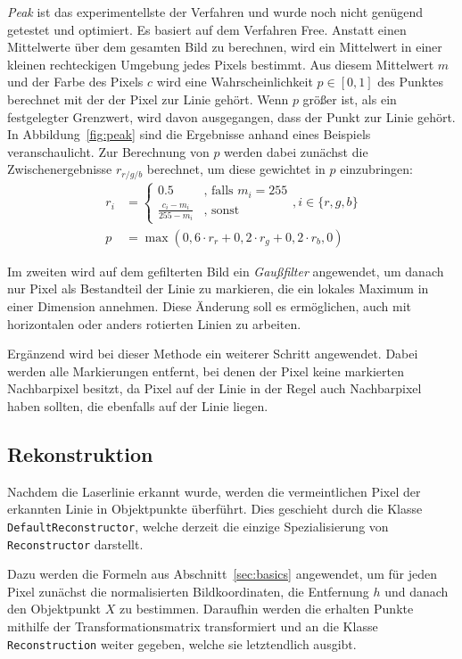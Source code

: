 \documentclass[ngerman,a4paper,parskip=half]{scrartcl}
\begin{document}
\emph{Peak} ist das experimentellste der Verfahren und wurde noch nicht genügend getestet und optimiert. Es basiert auf dem Verfahren Free.
Anstatt einen Mittelwerte über dem gesamten Bild zu berechnen, wird ein Mittelwert in einer kleinen rechteckigen Umgebung jedes Pixels bestimmt. Aus diesem Mittelwert $m$ und der Farbe des Pixels $c$ wird eine Wahrscheinlichkeit $p \in [0, 1]$ des Punktes berechnet mit der der Pixel zur Linie gehört. Wenn $p$ größer ist, als ein festgelegter Grenzwert, wird davon ausgegangen, dass der Punkt zur Linie gehört. In Abbildung~\ref{fig:peak} sind die Ergebnisse anhand eines Beispiels veranschaulicht.
Zur Berechnung von $p$ werden dabei zunächst die Zwischenergebnisse $r_{r/g/b}$ berechnet, um diese gewichtet in $p$ einzubringen:
\begin{align*}
	r_i &= \begin{cases}
	0.5                         &\text{, falls } m_i = 255\\
	\frac{c_i - m_i}{255 - m_i} &\text{, sonst}
	\end{cases}, i \in \{r,g,b\}\\
	p &= \max(0,6 \cdot r_r + 0,2 \cdot r_g + 0,2 \cdot r_b, 0)
\end{align*}

Im zweiten wird auf dem gefilterten Bild ein \emph{Gaußfilter} angewendet, um danach nur Pixel als Bestandteil der Linie zu markieren, die ein lokales Maximum in einer Dimension annehmen. Diese Änderung soll es ermöglichen, auch mit horizontalen oder anders rotierten Linien zu arbeiten.

Ergänzend wird bei dieser Methode ein weiterer Schritt angewendet. Dabei werden alle Markierungen entfernt, bei denen der Pixel keine markierten Nachbarpixel besitzt, da Pixel auf der Linie in der Regel auch Nachbarpixel haben sollten, die ebenfalls auf der Linie liegen.

\subsection{Rekonstruktion}

Nachdem die Laserlinie erkannt wurde, werden die vermeintlichen Pixel der erkannten Linie in Objektpunkte überführt. Dies geschieht durch die Klasse \texttt{DefaultReconstructor}, welche derzeit die einzige Spezialisierung von \texttt{Reconstructor} darstellt.

Dazu werden die Formeln aus Abschnitt~\ref{sec:basics} angewendet, um für jeden Pixel zunächst die normalisierten Bildkoordinaten, die Entfernung $h$ und danach den Objektpunkt $X$ zu bestimmen. Daraufhin werden die erhalten Punkte mithilfe der Transformationsmatrix transformiert und an die Klasse \texttt{Reconstruction} weiter gegeben, welche sie letztendlich ausgibt.
	
\end{document}
